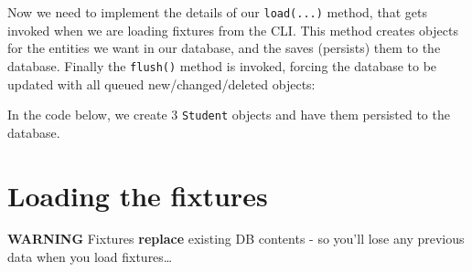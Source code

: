 \documentclass[a4paperpaper,openright]{book}
\newenvironment{Shaded}{}{}
\newcommand{\FunctionTok}[1]{\textcolor[rgb]{0.02,0.16,0.49}{#1}}
\newcommand{\KeywordTok}[1]{\textcolor[rgb]{0.00,0.44,0.13}{\textbf{#1}}}
\newcommand{\NormalTok}[1]{#1}
\newcommand{\OtherTok}[1]{\textcolor[rgb]{0.00,0.44,0.13}{#1}}
\newcommand{\StringTok}[1]{\textcolor[rgb]{0.25,0.44,0.63}{#1}}
\begin{document}
Now we need to implement the details of our \texttt{load(...)} method,
that gets invoked when we are loading fixtures from the CLI. This method
creates objects for the entities we want in our database, and the saves
(persists) them to the database. Finally the \texttt{flush()} method is
invoked, forcing the database to be updated with all queued
new/changed/deleted objects:

In the code below, we create 3 \texttt{Student} objects and have them
persisted to the database.

\begin{Shaded}
\end{Shaded}

\hypertarget{loading-the-fixtures}{%
\section{Loading the fixtures}\label{loading-the-fixtures}}

\textbf{WARNING} Fixtures \textbf{replace} existing DB contents - so
you'll lose any previous data when you load fixtures\ldots{}
\end{document}
